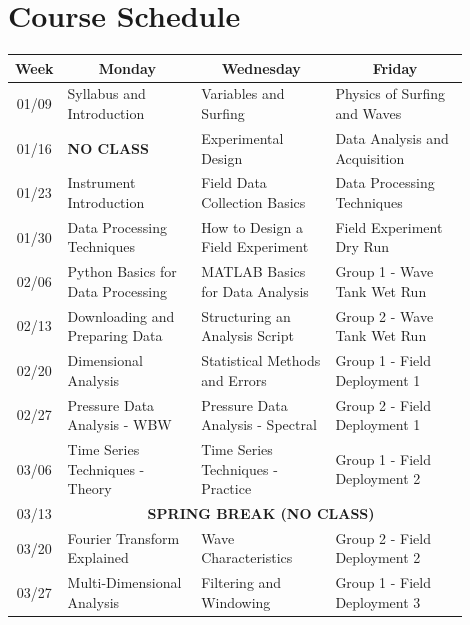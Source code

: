 \documentclass[
	letterpaper, %
	fontsize=10pt, %
	twoside=true, %
	numbers=noenddot, %
]{kaobook}
\begin{document}
\section*{Course Schedule} 
\begin{table}[h!]
    \begin{tabular}{ c | p{0.3\linewidth} | p{0.3\linewidth} | p{0.3\linewidth} }
        \toprule
        \textbf{Week} & \multicolumn{1}{c|}{\textbf{Monday}} & \multicolumn{1}{|c|}{\textbf{Wednesday}} & \multicolumn{1}{|c}{\textbf{Friday}} \\
        \midrule
        01/09   & Syllabus and Introduction         & Variables and Surfing             & Physics of Surfing and Waves      \\
        01/16   & \textbf{NO CLASS}                 & Experimental Design               & Data Analysis and Acquisition     \\    
        01/23   & Instrument Introduction           & Field Data Collection Basics      & Data Processing Techniques        \\
        01/30   & Data Processing Techniques        & How to Design a Field Experiment  & Field Experiment Dry Run          \\
        02/06   & Python Basics for Data Processing & MATLAB Basics for Data Analysis   & Group 1 - Wave Tank Wet Run       \\
        02/13   & Downloading and Preparing Data    & Structuring an Analysis Script    & Group 2 - Wave Tank Wet Run       \\
        02/20   & Dimensional Analysis              & Statistical Methods and Errors    & Group 1 - Field Deployment 1      \\
        02/27   & Pressure Data Analysis - WBW      & Pressure Data Analysis - Spectral & Group 2 - Field Deployment 1      \\
        03/06   & Time Series Techniques - Theory   & Time Series Techniques - Practice & Group 1 - Field Deployment 2      \\
        \hline
        03/13   & \multicolumn{3}{c}{\textbf{SPRING BREAK (NO CLASS)}}                                                      \\
        \hline
        03/20   & Fourier Transform Explained       & Wave Characteristics              & Group 2 - Field Deployment 2      \\
        03/27   & Multi-Dimensional Analysis        & Filtering and Windowing           & Group 1 - Field Deployment 3      \\

\end{tabular}
\end{table}
\end{document}
